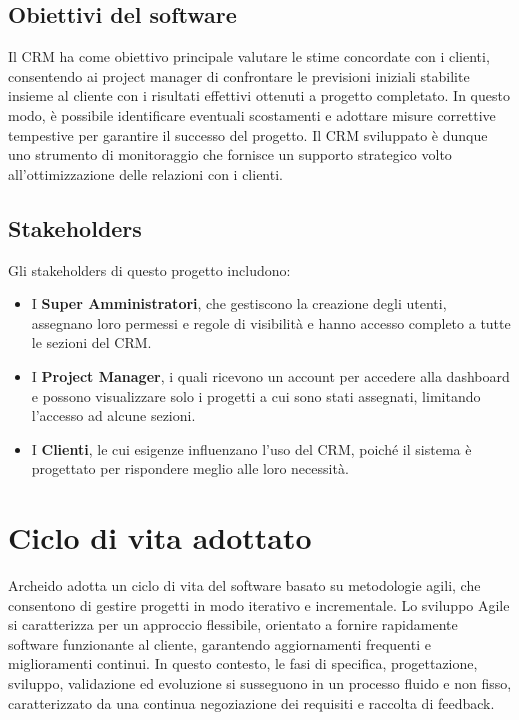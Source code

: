 \documentclass[target=bach,aauheader=,style=]{thud}
\begin{document}
\subsection{Obiettivi del software}
Il CRM ha come obiettivo principale valutare le stime concordate con i clienti, consentendo ai project manager di confrontare le previsioni iniziali stabilite insieme al cliente con i risultati effettivi ottenuti a progetto completato. In questo modo, è possibile identificare eventuali scostamenti e adottare misure correttive tempestive per garantire il successo del progetto. Il CRM sviluppato è dunque uno strumento di monitoraggio che fornisce un supporto strategico volto all'ottimizzazione delle relazioni con i clienti.

\subsection{Stakeholders}
Gli stakeholders di questo progetto includono:

\begin{itemize}
    \item I \textbf{Super Amministratori}, che gestiscono la creazione degli utenti, assegnano loro permessi e regole di visibilità e hanno accesso completo a tutte le sezioni del CRM. 
    \item I \textbf{Project Manager}, i quali ricevono un account per accedere alla dashboard e possono visualizzare solo i progetti a cui sono stati assegnati, limitando l'accesso ad alcune sezioni.
    \item I \textbf{Clienti}, le cui esigenze influenzano l'uso del CRM, poiché il sistema è progettato per rispondere meglio alle loro necessità.
\end{itemize}

\section{Ciclo di vita adottato}
Archeido adotta un ciclo di vita del software basato su metodologie agili, che consentono di gestire progetti in modo iterativo e incrementale. Lo sviluppo Agile si caratterizza per un approccio flessibile, orientato a fornire rapidamente software funzionante al cliente, garantendo aggiornamenti frequenti e miglioramenti continui. In questo contesto, le fasi di specifica, progettazione, sviluppo, validazione ed evoluzione si susseguono in un processo fluido e non fisso, caratterizzato da una continua negoziazione dei requisiti e raccolta di feedback.
\end{document}
